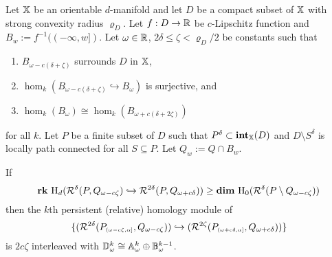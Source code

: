 

\begin{theorem}
  Let $\mathbb{X}$ be an orientable $d$-manifold and let $D$ be a compact subset of $\mathbb{X}$ with strong convexity radius $\varrho_D$.
  Let $f : D\to\mathbb{R}$ be $c$-Lipschitz function and $B_w := f^{-1}((-\infty,w])$.
  Let $\omega\in\mathbb{R}$, $2\delta\leq \zeta < \varrho_D/2$ be constants such that
  \begin{enumerate}[label=\Roman*.]
    \item $B_{\omega-c(\delta+\zeta)}$ surrounds $D$ in $\mathbb{X}$,
    \item $\hom_k(B_{\omega-c(\delta+\zeta)}\hookrightarrow B_\omega)$ is surjective, and
    \item $\hom_k(B_\omega)\cong\hom_k(B_{\omega+c(\delta+2\zeta)})$
  \end{enumerate}
  for all $k$.
  Let $P$ be a finite subset of $D$ such that $P^\delta\subset \mathbf{int}_{\mathbb{X}}(D)$ and $D\setminus S^\delta$ is locally path connected for all $S\subseteq P$.
  Let $Q_w := Q\cap B_w$.

  If
  \[\mathbf{rk}~\mathrm{H}_d(\mathcal{R}^\delta(P, Q_{\omega -c\zeta})\hookrightarrow \mathcal{R}^{2\delta}(P, Q_{\omega+c\delta})) \geq \mathbf{dim}~\mathrm{H}_0(\mathcal{R}^\delta(P\setminus Q_{\omega-c\zeta}))\]
  then the $k$th persistent (relative) homology module of
  \[
    \{(\mathcal{R}^{2\delta}(P_{\scriptscriptstyle (\omega-c\zeta,\alpha]},Q_{\omega-c\zeta})) \hookrightarrow
      (\mathcal{R}^{2\zeta}(P_{\scriptscriptstyle (\omega+c\delta,\alpha]}, Q_{\omega+c\delta}))\}
  \] is $2c\zeta$ interleaved with $\mathbb{D}_{\omega}^k \cong \mathbb{A}_\omega^k\oplus \mathbb{B}_\omega^{k-1}$.
\end{theorem}
